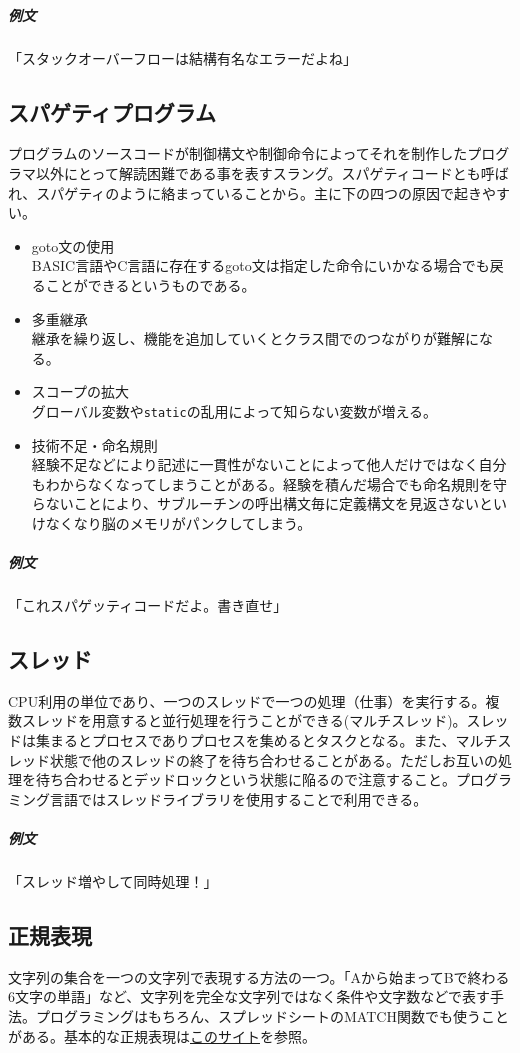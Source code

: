 \documentclass[a4paper]{ltjsreport}
\newcommand{\link}[2]{\href{#2}{#1}}
\newcommand{\terlogy}[2][|]{\colorbox{terlogy}{\texttt{\lstinline#1#2#1}}}
\begin{document}
\subparagraph{例文}「スタックオーバーフローは結構有名なエラーだよね」

\subsection{スパゲティプログラム}
プログラムのソースコードが制御構文や制御命令によってそれを制作したプログラマ以外にとって解読困難である事を表すスラング。スパゲティコードとも呼ばれ、スパゲティのように絡まっていることから。主に下の四つの原因で起きやすい。
\begin{itemize}
  \item goto文の使用\\
        BASIC言語やC言語に存在するgoto文は指定した命令にいかなる場合でも戻ることができるというものである。
  \item 多重継承\\
        継承を繰り返し、機能を追加していくとクラス間でのつながりが難解になる。
  \item スコープの拡大\\
        グローバル変数や\terlogy{static}の乱用によって知らない変数が増える。
  \item 技術不足・命名規則\\
        経験不足などにより記述に一貫性がないことによって他人だけではなく自分もわからなくなってしまうことがある。経験を積んだ場合でも命名規則を守らないことにより、サブルーチンの呼出構文毎に定義構文を見返さないといけなくなり脳のメモリがパンクしてしまう。
\end{itemize}

\subparagraph{例文}「これスパゲッティコードだよ。書き直せ」

\subsection{スレッド}
CPU利用の単位であり、一つのスレッドで一つの処理（仕事）を実行する。複数スレッドを用意すると並行処理を行うことができる(マルチスレッド)。スレッドは集まるとプロセスでありプロセスを集めるとタスクとなる。また、マルチスレッド状態で他のスレッドの終了を待ち合わせることがある。ただしお互いの処理を待ち合わせるとデッドロックという状態に陥るので注意すること。プログラミング言語ではスレッドライブラリを使用することで利用できる。

\subparagraph{例文}「スレッド増やして同時処理！」

\subsection{正規表現}
文字列の集合を一つの文字列で表現する方法の一つ。「Aから始まってBで終わる6文字の単語」など、文字列を完全な文字列ではなく条件や文字数などで表す手法。プログラミングはもちろん、スプレッドシートのMATCH関数でも使うことがある。基本的な正規表現は\link{このサイト}{https://murashun.jp/article/programming/regular-expression.html}を参照。
\end{document}
